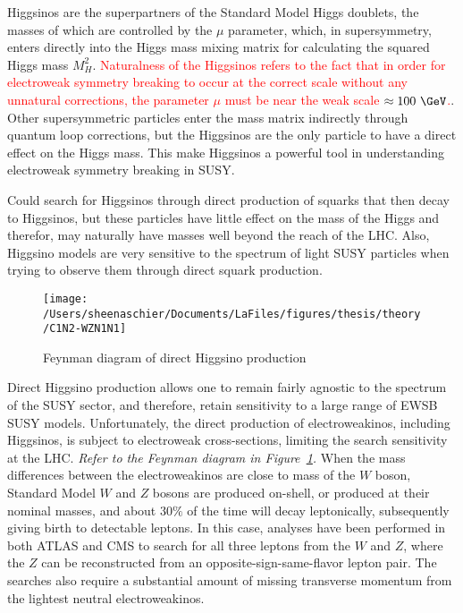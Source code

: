 Higgsinos are the superpartners of the Standard Model Higgs doublets, the masses of which are controlled by the $\mu$ parameter, which, in supersymmetry, enters directly into the Higgs mass mixing matrix for calculating the squared Higgs mass $M_H^2$. \cite{han}  \textcolor{red}{Naturalness of the Higgsinos refers to the fact that in order for electroweak symmetry breaking to occur at the correct scale without any unnatural corrections, the parameter $\mu$ must be near the weak scale $\approx 100~\GeV$.}. Other supersymmetric particles enter the mass matrix indirectly through quantum loop corrections, but the Higgsinos are the only particle to have a direct effect on the Higgs mass.  This make Higgsinos a powerful tool in understanding electroweak symmetry breaking in SUSY.

Could search for Higgsinos through direct production of squarks that then decay to Higgsinos, but these particles have little effect on the mass of the Higgs and therefor, may naturally have masses well beyond the reach of the LHC.  Also, Higgsino models are very sensitive to the spectrum of light SUSY particles when trying to observe them through direct squark production.

 \begin{figure}%
  \begin{center}
  \texttt{[image: /Users/sheenaschier/Documents/LaFiles/figures/thesis/theory/C1N2-WZN1N1]}
   \end{center}
 \caption{Feynman diagram of direct Higgsino production}
 \label{fig:fn1}
 \end{figure}
 
Direct Higgsino production allows one to remain fairly agnostic to the spectrum of the SUSY sector, and therefore, retain sensitivity to a large range of EWSB SUSY models.  Unfortunately, the direct production of electroweakinos, including Higgsinos, is subject to electroweak cross-sections, limiting the search sensitivity at the LHC.  \textit{Refer to the Feynman diagram in Figure~\ref{fig:fn1}.}  When the mass differences between the electroweakinos are close to mass of the $W$ boson, Standard Model $W$ and $Z$ bosons are produced on-shell, or produced at their nominal masses, and about $30\%$ of the time will decay leptonically, subsequently giving birth to detectable leptons.  In this case, analyses have been performed in both ATLAS and CMS to search for all three leptons from the $W$ and $Z$, where the $Z$ can be reconstructed from an opposite-sign-same-flavor lepton pair.  The searches also require a substantial amount of missing transverse momentum from the lightest neutral electroweakinos.

